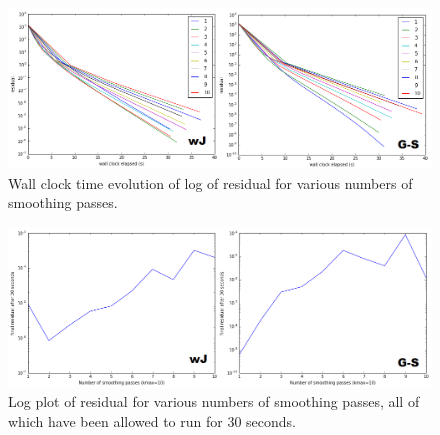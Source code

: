 \documentclass[letterpaper,10pt]{article}
\begin{document}
\begin{figure}[!htb]
\centering
\includegraphics[width=1\textwidth]{restimeJG.PNG}
\caption{Wall clock time evolution of log of residual for various numbers of smoothing passes.}
\end{figure}

\begin{figure}[!htb]
\centering
\includegraphics[width=1\textwidth]{resfJG.PNG}
\caption{Log plot of residual for various numbers of smoothing passes, all of which have been allowed to run for 30 seconds.}
\end{figure}
\end{document}

